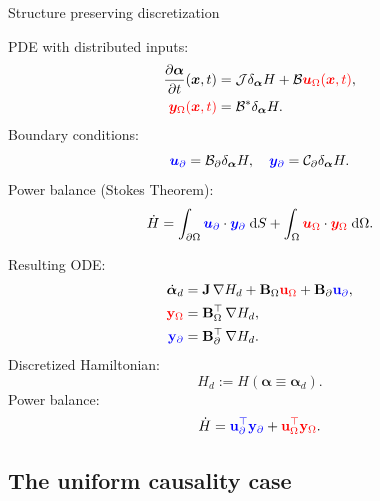 \documentclass[aspectratio=169]{ISAE-Beamer}
\begin{document}
\begin{frame}{Structure preserving discretization}
	\begin{tcbraster}[raster columns=2, raster equal height]
		\begin{tcolorbox}[width=0.4\textwidth, nobeforeafter, colframe=theme,title=Infinite-dimensional pH system]%
			PDE with distributed inputs:
			\begin{align*}
			\diffp{\bm{\alpha}}{t}(\bm{x}, t) &= \mathcal{J} \delta_{\bm{\alpha}} H + \mathcal{B} \textcolor{red}{\bm{u}_\Omega(\bm{x}, t)}, \\
			\textcolor{red}{\bm{y}_\Omega(\bm{x}, t)} &= \mathcal{B}^* \delta_{\bm{\alpha}} H.
			\end{align*}
			Boundary conditions: 
			\[\textcolor{blue}{\bm{u}_\partial} = \mathcal{B}_\partial \delta_{\bm{\alpha}} H, \quad \textcolor{blue}{\bm{y}_\partial} = \mathcal{C}_\partial \delta_{\bm{\alpha}} H. \]
			Power balance (Stokes Theorem): 
			\[ \dot{H} = \displaystyle \int_{\partial \Omega} \textcolor{blue}{\bm{u}_\partial} \cdot \textcolor{blue}{\bm{y}_\partial} \d{S} +  \int_{\Omega} \textcolor{red}{\bm{u}_\Omega} \cdot \textcolor{red}{\bm{y}_\Omega} \d{\Omega}.
			\]
		\end{tcolorbox} 
		\begin{tcolorbox}[width=0.4\textwidth, nobeforeafter,  colframe=theme,title=Structure-preserving discretization]%
			Resulting ODE:
			\begin{align*}
			\dot{\bm{\alpha}}_d &= \mathbf{J} \, {\nabla {H}_d} + \mathbf{B}_\Omega \textcolor{red}{\mathbf{u}_\Omega} + \mathbf{B}_\partial \textcolor{blue}{\mathbf{u}_\partial}, \\
			\textcolor{red}{\mathbf{y}_\Omega} &= \mathbf{B}_\Omega^\top \, {\nabla {H}_d}, \\
			\textcolor{blue}{\mathbf{y}_\partial} &= \mathbf{B}_\partial^\top \,{\nabla {H}_d}.
			\end{align*}
			Discretized Hamiltonian:
			\[
			H_d := H(\bm{\alpha} \equiv \bm{\alpha}_d).
			\]
			Power balance: 
			\[ \dot{H} = \textcolor{blue}{\mathbf{u}_\partial^\top \mathbf{y}_\partial} +  \textcolor{red}{\mathbf{u}_\Omega^\top \mathbf{y}_\Omega}.
			\]
		\end{tcolorbox}
	\end{tcbraster}
\end{frame}

\subsection{The uniform causality case}
\end{document}
